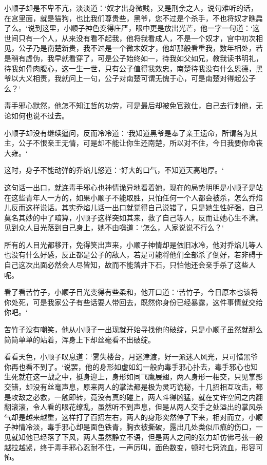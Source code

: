 小顺子却是不卑不亢，淡淡道：‘奴才出身微贱，又是刑余之人，说句难听的话，在宫里面，就是猫狗，也比我们尊贵些，黑爷，您不过是个杀手，不也将奴才瞧扁了么。‘说到这里，小顺子神色变得庄严，眼中更是放出光芒，他一字一句道：‘这世间只有一个人，从来没有看不起我，他将我看成人，不是一个奴才，宫中初次相见，公子乃是南楚新贵，我不过是一个微末奴才，他却那般看重我，数年相处，若是稍有虚伪，我早就看穿了，可是公子始终如一，待我如父如兄，教我读书明礼，待我如骨肉腹心，这一生一世，只有公子值得我效忠，南楚待我没有什么恩德，黑爷以大义相责，我就问上一句，公子对南楚可谓无愧于心，可是南楚对得起公子么？‘

毒手邪心默然，他怎不知江哲的功劳，可是最后却被免官致仕，自己去行刺他，无论如何也说不过去。

小顺子却没有继续逼问，反而冷冷道：‘我知道黑爷是奉了亲王遗命，所谓各为其主，公子不恨亲王无情，可是却不能让你生还南楚，所以对不住，今日我要你命丧大雍。‘

这时，身子不能动弹的乔焰儿怒道：‘好大的口气，不知道天高地厚。‘

这句话一出口，就连毒手邪心也神情诡异地看着她，现在的局势明明是小顺子是站在这些青年人一方的，如果小顺子不能取胜，只怕任何一个人都会被杀，怎么乔焰儿反而这样说话。其实乔焰儿话一出口就觉得自己说错了，只是她生性好强，自己莫名其妙的中了暗算，小顺子这样突如其来，救了自己等人，反而让她心生不满。见到众人目光落到自己身上，她不由嗔道：‘怎么，人家说说不行么？‘

所有的人目光都移开，免得笑出声来，小顺子神情却是依旧冰冷，他对乔焰儿等人也没有什么好感，反正都是公子的敌人，若是可能将他们全部杀了倒好，若非碍于自己这次出面必然会人尽皆知，故而不能落井下石，只怕他还会亲手杀了这些人呢。

看了看苦竹子，小顺子目光变得有些柔和，他开口道：‘苦竹子，今日原本也该将你处死，可是我家公子有些话要人带回去，既然你身份已经暴露，这件事情就交给你吧。‘

苦竹子没有嘲笑，他从小顺子一出现就开始寻找他的破绽，只是小顺子虽然就那么简简单单的站着，浑身上下却丝毫看不出破绽。

看看天色，小顺子叹息道：‘雾失楼台，月迷津渡，好一派迷人风光，只可惜黑爷你再也看不到了。‘说罢，他的身形如虚如幻一般向毒手邪心扑去，毒手邪心也知生死就在这一战之中，挺身迎上，身形如同飞鹰展翅，两人身形一相交，只见掌影交错，却没有丝毫声息，原来两人的掌法都是极为灵巧诡秘，十几招相互攻击，都是攻敌之必救，一触即转，竟没有真的碰上，两人斗得凶猛，就在丈许空间之内翻翻滚滚，令人看的眼花缭乱，虽然听不到声息，但是从两人交手之处溢出的掌风杀气却是越来越重，这样打了百招左右，两人的身形突然停了下来，相对而立，小顺子神情冷淡，毒手邪心却是面色铁青，胸衣被撕破，露出几处类似爪痕的伤口，一见就知他已经落了下风，两人虽然静立不语，但是两人之间的张力却仿佛弓弦一般越拉越紧，终于毒手邪心忍耐不住，一声厉叫，面色数变，顿时七窍流血，形容可怖。

